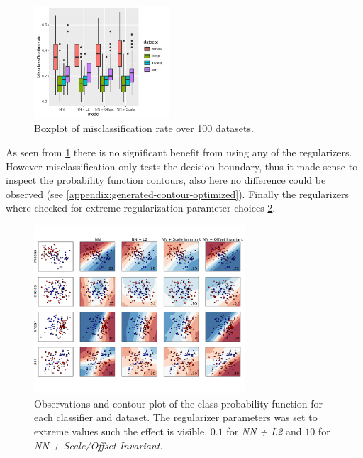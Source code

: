 \begin{figure}[h]
	\centering
	\includegraphics[width=0.45\textwidth]{plots/2d_significant}
	\caption{Boxplot of misclassification rate over 100 datasets.}
	\label{fig:2d_significant}
\end{figure}

As seen from \cref{fig:2d_significant} there is no significant benefit from using any of the regularizers. However misclassification only tests the decision boundary, thus it made sense to inspect the probability function contours, also here no difference could be observed (see \cref{appendix:generated-contour-optimized}). Finally the regularizers where checked for extreme regularization parameter choices \cref{plt:generated-contour-extream}.

\begin{figure}[ht]
	\centering
	\includegraphics[width=0.7\textwidth, trim = 0 2.2cm 0 1.5cm, clip]{plots/2d_classifier-extream}
	\caption{Observations and contour plot of the class probability function for each classifier and dataset. The regularizer parameters was set to extreme values such the effect is visible. $0.1$ for \textit{NN + L2} and $10$ for \textit{NN + Scale/Offset Invariant}.}
	\label{plt:generated-contour-extream}
\end{figure}
